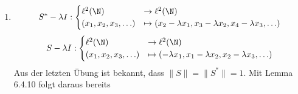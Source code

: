 \begin{solution}
\begin{enumerate}[label = (\alph*)]
  \item \begin{align*}
    S^* - \lambda I:
    \begin{cases}
      \ell^2(\N)             & \to     \ell^2(\N) \\
      (x_1, x_2, x_3, \ldots) & \mapsto (x_2 - \lambda x_1, x_3 - \lambda x_2, x_4 - \lambda x_3, \ldots)
    \end{cases}
  \end{align*}
  \begin{align*}
    S - \lambda I:
    \begin{cases}
      \ell^2(\N)             & \to     \ell^2(\N) \\
      (x_1, x_2, x_3, \ldots) & \mapsto (- \lambda x_1, x_1 - \lambda x_2, x_2 - \lambda x_3, \ldots)
    \end{cases}
  \end{align*}
  Aus der letzten Übung ist bekannt, dass $\|S\| = \|S^*\| = 1$. Mit Lemma 6.4.10
  folgt daraus bereits


\end{enumerate}
\end{solution}

